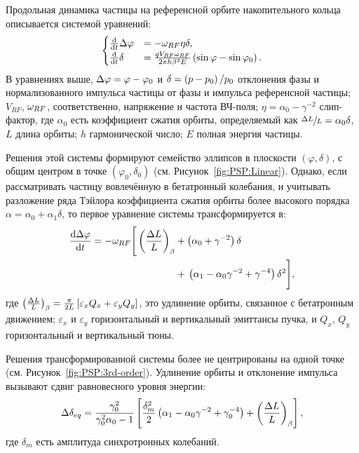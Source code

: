 Продольная динамика частицы на референсной орбите накопительного кольца описывается
системой уравнений:
\begin{equation}
\begin{cases}
\ddt{}\D\varphi &= -\w_{RF}\eta\delta, \\
\ddt{}\delta &= \frac{q V_{RF}\w_{RF}}{2\pi h\beta^2E}\bkt{\sin\varphi - \sin\varphi_0}.
\end{cases}
\end{equation}
В уравнениях выше, $\Delta\varphi = \varphi - \varphi_0$ и
$\delta = \bkt{p-p_0}/{p_0}$ отклонения фазы и нормализованного импульса частицы
от фазы и импульса референсной частицы;
 $V_{RF}$, $\omega_{RF}$, соответственно,
 напряжение и частота ВЧ-поля; $\eta = \alpha_0 - \gamma^{-2}$ слип-фактор,
 где $\alpha_0$ есть коэффициент сжатия орбиты, определяемый как $\sfrac{\Delta L}{L} = \alpha_0\delta$,
 $L$ длина орбиты; $h$ гармонической число; $E$ полная энергия частицы.

Решения этой системы формируют семейство эллипсов в плоскости $(\varphi, \delta)$, с общим центром в
точке $(\varphi_0,\delta_0)$ (см. Рисунок~\ref{fig:PSP:Linear}). Однако, если рассматривать частицу вовлечённую в бетатронный колебания, и
учитывать разложение ряда Тэйлора коэффициента сжатия орбиты более высокого порядка
$\alpha = \alpha_0 + \alpha_1\delta$, то первое уравнение системы
трансформируется в:~\cite[p.~2579]{Senichev:IPAC13}
\begin{align*}
\ddt{\D\varphi} = -\w_{RF} \Bigg[\bkt{\frac{\Delta L}{L}}_\beta &+ \bkt{\alpha_0 + \gamma^{-2}}\delta \Bigg.\\
&+ \Bigg.\bkt{\alpha_1 - \alpha_0\gamma^{-2} + \gamma^{-4}}\delta^2\Bigg],
\end{align*}
где $\bkt{\frac{\Delta L}{L}}_\beta = \frac{\pi}{2L}\bkt*{\varepsilon_xQ_x + \varepsilon_yQ_y}$, это
удлинение орбиты, связанное с бетатронным движением; $\varepsilon_x$ и $\varepsilon_y$ 
горизонтальный и вертикальный эмиттансы пучка, и $Q_x$, $Q_y$ горизонтальный и вертикальный тюны.

Решения трансформированной системы более не центрированы на одной точке (см. Рисунок~\ref{fig:PSP:3rd-order}). Удлинение орбиты
и отклонение импульса вызывают сдвиг равновесного уровня энергии:~\cite[p.~2581]{Senichev:IPAC13}
\begin{equation}\label{eq:EquLevMom_shift}
\Delta\delta_{eq} = \frac{\gamma_0^2}{\gamma_0^2\alpha_0 - 1}\bkt*{\frac{\delta_m^2}{2}\bkt{\alpha_1 - \alpha_0\gamma^{-2} + \gamma_0^{-4}} + \bkt{\frac{\Delta L}{L}}_\beta},
\end{equation}
где $\delta_m$ есть амплитуда синхротронных колебаний.

